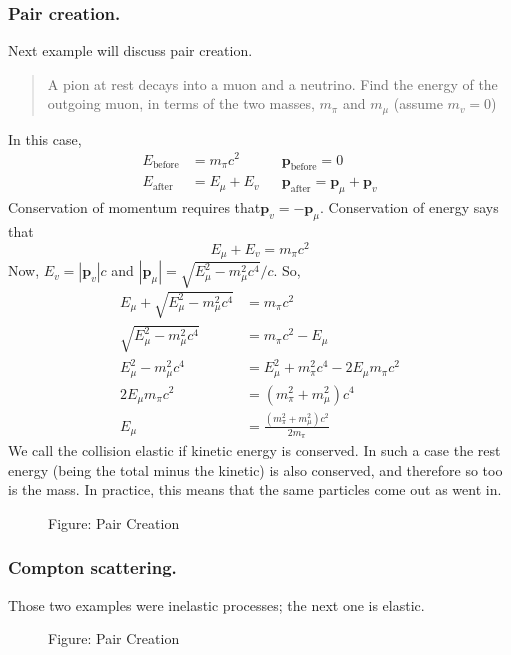 \documentclass[../../../main.tex]{subfiles}
\begin{document}
\subsubsection{Pair creation.} Next example will discuss pair creation. 
\begin{quote}
    A pion at rest decays into a muon and a neutrino. Find the energy of the outgoing muon, in terms of the two masses, $m_\pi$ and $m_\mu$ (assume $m_v = 0$)
\end{quote}
In this case,
\begin{align*}
    E_{\text{before}}&=m_\pi c^2&&\mathbf{p}_{\text{before}}=0\\
    E_{\text{after}}&=E_\mu+E_v&&\mathbf{p}_{\text{after}}=\mathbf{p}_\mu+\mathbf{p}_v
\end{align*}
Conservation of momentum requires that$ \mathbf{p}_v = -\mathbf{p}_\mu$. Conservation of energy says that
\begin{equation*}
   E_\mu+E_v= m_\pi c^2
\end{equation*}
Now, $E_v = |\mathbf{p}_v |c$ and $| \mathbf{p}_\mu |=\sqrt{E_\mu^2-m^2_\mu c^4}/c$. So,
\begin{align*}
    E_\mu+\sqrt{E_\mu^2-m^2_\mu c^4}&=m_\pi c^2\\
    \sqrt{E_\mu^2-m^2_\mu c^4}&=m_\pi c^2-E_\mu\\
    E_\mu^2-m^2_\mu c^4&=E_\mu^2+m_\pi^2 c^4-2E_\mu m_\pi c^2\\
    2E_\mu m_\pi c^2&=(m_\pi^2+m^2_\mu)c^4\\
    E_\mu&=\frac{(m^2_\pi+m^2_\mu)c^2}{2m_\pi}
\end{align*}
We call the collision elastic if kinetic energy is conserved. In such a case the rest energy (being the total minus the kinetic) is also conserved, and therefore so too is the mass. In practice, this means that the same particles come out as went in. 
\begin{figure}[t]
    \centering
    \caption*{Figure: Pair Creation}
\end{figure}

\subsubsection{Compton scattering.} Those two examples were inelastic processes; the next one is elastic.
\begin{figure}[b]
    \centering
    \caption*{Figure: Pair Creation}
\end{figure}
\end{document}
